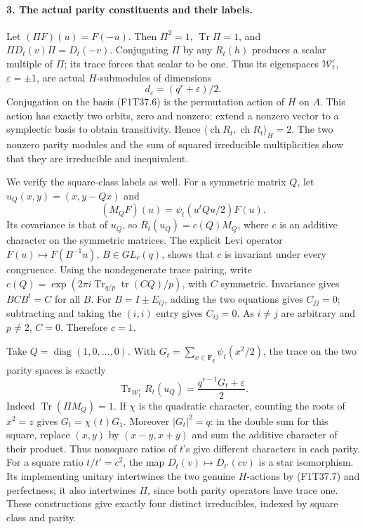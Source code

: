 \paragraph{3. The actual parity constituents and their labels.}
Let \((\Pi F)(u)=F(-u)\). Then
\(\Pi^2=1\), \(\operatorname{Tr}\Pi=1\), and
\(\Pi D_t(v)\Pi=D_t(-v)\). Conjugating \(\Pi\)
by any \(R_t(h)\) produces a scalar multiple of \(\Pi\);
its trace forces that scalar to be one. Thus its eigenspaces
\(\mathcal W_t^{\varepsilon}\), \(\varepsilon=\pm1\),
are actual \(H\)-submodules of dimensions
\[
              d_\varepsilon=(q^r+\varepsilon)/2.
\tag{F1T37.8}
\]
Conjugation on the basis (F1T37.6) is the permutation action
of \(H\) on \(A\). This action has exactly two orbits,
zero and nonzero: extend a nonzero vector to a symplectic
basis to obtain transitivity. Hence
\(\langle\operatorname{ch}R_t,\operatorname{ch}R_t\rangle_H=2\).
The two nonzero parity modules and the sum of squared
irreducible multiplicities show that they are irreducible
and inequivalent.

We verify the square-class labels as well. For a symmetric
matrix \(Q\), let \(u_Q(x,y)=(x,y-Qx)\) and
\[
          (M_QF)(u)=\psi_t(u^tQu/2)F(u).
\]
Its covariance is that of \(u_Q\), so
\(R_t(u_Q)=c(Q)M_Q\), where \(c\) is an additive
character on the symmetric matrices. The explicit Levi
operator \(F(u)\mapsto F(B^{-1}u)\), \(B\in GL_r(q)\),
shows that \(c\) is invariant under every congruence.
Using the nondegenerate trace pairing, write
\(c(Q)=\exp(2\pi i\operatorname{Tr}_{q/p}
\operatorname{tr}(CQ)/p)\), with \(C\) symmetric.
Invariance gives \(BCB^t=C\) for all \(B\).
For \(B=I\pm E_{ij}\), adding the two equations gives
\(C_{jj}=0\); subtracting and taking the \((i,i)\) entry
gives \(C_{ij}=0\). As \(i\ne j\) are arbitrary and
\(p\ne2\), \(C=0\). Therefore \(c=1\).

Take \(Q=\operatorname{diag}(1,0,\ldots,0)\).
With \(G_t=\sum_{x\in\mathbf F_q}\psi_t(x^2/2)\),
the trace on the two parity spaces is exactly
\[
 \operatorname{Tr}_{\mathcal W_t^\varepsilon}R_t(u_Q)
          =\frac{q^{r-1}G_t+\varepsilon}{2}.
\tag{F1T37.9}
\]
Indeed \(\operatorname{Tr}(\Pi M_Q)=1\). If \(\chi\)
is the quadratic character, counting the roots of \(x^2=z\)
gives \(G_t=\chi(t)G_1\). Moreover
\(\lvert G_t\rvert^2=q\): in the double sum for this
square, replace \((x,y)\) by \((x-y,x+y)\) and sum the
additive character of their product. Thus nonsquare ratios
of \(t\)'s give different characters in each parity.
For a square ratio \(t/t'=c^2\), the map
\(D_t(v)\mapsto D_{t'}(cv)\) is a star isomorphism.
Its implementing unitary intertwines the two genuine
\(H\)-actions by (F1T37.7) and perfectness; it also
intertwines \(\Pi\), since both parity operators have
trace one. These constructions give exactly four distinct
irreducibles, indexed by square class and parity.

